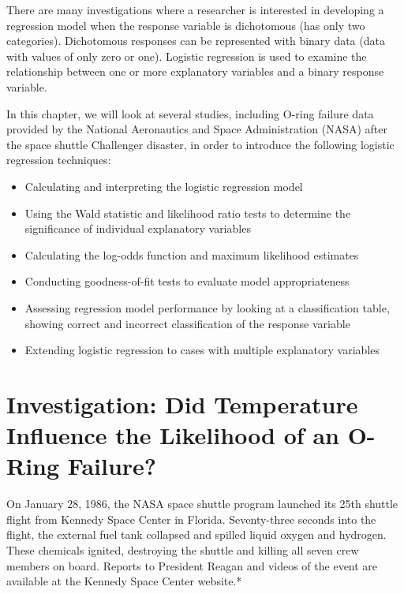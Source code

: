 \documentclass[
]{report}
\providecommand{\tightlist}{%
  \setlength{\itemsep}{0pt}\setlength{\parskip}{0pt}}
\begin{document}
There are many investigations where a researcher is interested in developing a regression model when the response variable is dichotomous (has only two categories). Dichotomous responses can be represented with binary data (data with values of only zero or one). Logistic regression is used to examine the relationship between one or more explanatory variables and a binary response variable.

In this chapter, we will look at several studies, including O-ring failure data provided by the National Aeronautics and Space Administration (NASA) after the space shuttle Challenger disaster, in order to introduce the following logistic regression techniques:

\begin{itemize}
\tightlist
\item
  Calculating and interpreting the logistic regression model\\
\item
  Using the Wald statistic and likelihood ratio tests to determine the significance of individual explanatory variables\\
\item
  Calculating the log-odds function and maximum likelihood estimates\\
\item
  Conducting goodness-of-fit tests to evaluate model appropriateness\\
\item
  Assessing regression model performance by looking at a classification table, showing correct and incorrect classification of the response variable\\
\item
  Extending logistic regression to cases with multiple explanatory variables
\end{itemize}

\section{\texorpdfstring{\textbf{Investigation: Did Temperature Influence the Likelihood of an O-Ring Failure?}}{Investigation: Did Temperature Influence the Likelihood of an O-Ring Failure?}}\label{investigation-did-temperature-influence-the-likelihood-of-an-o-ring-failure}

On January 28, 1986, the NASA space shuttle program launched its 25th shuttle flight from Kennedy Space Center in Florida. Seventy-three seconds into the flight, the external fuel tank collapsed and spilled liquid oxygen and hydrogen. These chemicals ignited, destroying the shuttle and killing all seven crew members on board. Reports to President Reagan and videos of the event are available at the Kennedy Space Center website.*
\end{document}
